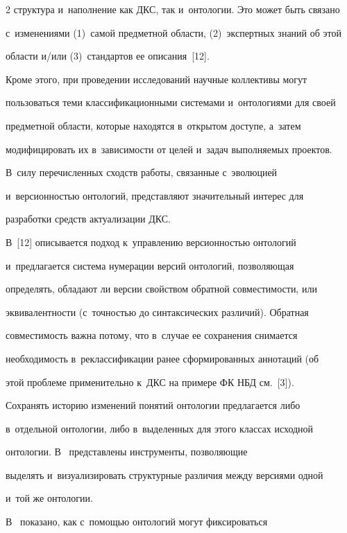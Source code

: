 \begin{multicols}{2}
структура и~наполнение как ДКС, так и~онтологии. Это может быть связано 


с~изменениями (1)~самой предметной об\-ласти, (2)~экспертных знаний об этой 


области и/или (3)~стандартов ее описания~[12].





Кроме этого, при проведении исследований научные коллективы могут 


пользоваться теми классификационными системами и~онтологиями для \mbox{своей} 


предметной области, которые находятся в~откры\-том доступе, а~затем 


модифицировать их в~зависимости от целей и~задач выполняемых проектов. 


В~силу перечисленных сходств работы, связанные с~эволюцией 


и~версионностью онтологий, представляют значительный интерес для 


разработки средств актуализации ДКС.





В~[12] описывается подход к~управлению версионностью онтологий 


и~предлагается система нумерации версий онтологий, позволяющая 


определять, обладают ли версии свойством обратной \mbox{совместимости}, или 


эквивалентности (с~точ\-ностью до синтаксических различий). Обратная 


совместимость важна потому, что в~случае ее сохранения снимается 


необходимость в~реклассификации ранее сформированных аннотаций (об 


этой проблеме применительно к~ДКС на примере ФК НБД см.~[3]). 


Сохранять историю изменений понятий онтологии предлагается либо 


в~отдельной онтологии, либо в~выделенных для этого классах исходной 


онтологии. В~\cite{13-gon} представлены инструменты, позволяющие 


выделять и~визуализировать структурные различия между версиями одной 


и~той же онтологии.





В~\cite{14-gon} показано, как с~помощью онтологий могут фиксироваться 



\end{multicols}

